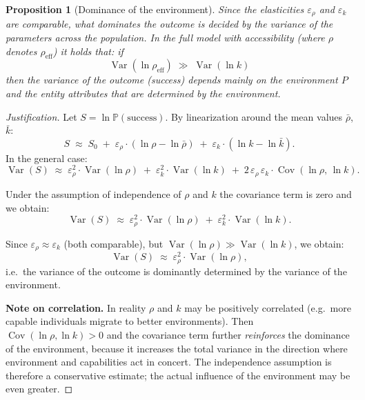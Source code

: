 \documentclass[12pt,a4paper]{article}
\newtheorem{proposition}{Proposition}[section]
\begin{document}
\begin{proposition}[Dominance of the environment]\label{prop:dominancia}
Since the elasticities $\varepsilon_\rho$ and $\varepsilon_k$ are comparable, what dominates the outcome is decided by the variance of the parameters across the population. In the full model with accessibility (where $\rho$ denotes $\rho_{\text{eff}}$) it holds that: if
\begin{equation}\label{eq:hlavny}
    \boxed{\;\operatorname{Var}(\ln \rho_{\text{eff}}) \;\gg\; \operatorname{Var}(\ln k)\;}
\end{equation}
then the variance of the outcome (success) depends mainly on the environment $P$ and the entity attributes that are determined by the environment.
\end{proposition}

\begin{proof}[Justification]
Let $S = \ln \mathbb{P}(\text{success})$. By linearization around the mean values $\bar{\rho}$, $\bar{k}$:
\begin{equation}
    S \;\approx\; S_0 \;+\; \varepsilon_\rho \cdot (\ln \rho - \ln \bar{\rho}) \;+\; \varepsilon_k \cdot (\ln k - \ln \bar{k}).
\end{equation}
In the general case:
\begin{equation}
    \operatorname{Var}(S) \;\approx\; \varepsilon_\rho^2 \cdot \operatorname{Var}(\ln \rho) \;+\; \varepsilon_k^2 \cdot \operatorname{Var}(\ln k) \;+\; 2\,\varepsilon_\rho\,\varepsilon_k \cdot \operatorname{Cov}(\ln \rho,\, \ln k).
\end{equation}

Under the assumption of independence of $\rho$ and $k$ the covariance term is zero and we obtain:
\begin{equation}
    \operatorname{Var}(S) \;\approx\; \varepsilon_\rho^2 \cdot \operatorname{Var}(\ln \rho) \;+\; \varepsilon_k^2 \cdot \operatorname{Var}(\ln k).
\end{equation}

Since $\varepsilon_\rho \approx \varepsilon_k$ (both comparable), but $\operatorname{Var}(\ln \rho) \gg \operatorname{Var}(\ln k)$, we obtain:
\begin{equation}
    \operatorname{Var}(S) \;\approx\; \varepsilon_\rho^2 \cdot \operatorname{Var}(\ln \rho),
\end{equation}
i.e.\ the variance of the outcome is dominantly determined by the variance of the environment.

\textbf{Note on correlation.} In reality $\rho$ and $k$ may be positively correlated (e.g.\ more capable individuals migrate to better environments). Then $\operatorname{Cov}(\ln \rho, \ln k) > 0$ and the covariance term further \emph{reinforces} the dominance of the environment, because it increases the total variance in the direction where environment and capabilities act in concert. The independence assumption is therefore a conservative estimate; the actual influence of the environment may be even greater.
\end{proof}
\end{document}
